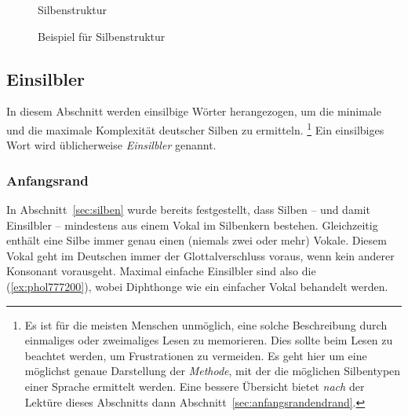 \begin{figure}
  \centering
  \caption{Silbenstruktur}
  \label{fig:silbenstruktur}
\end{figure}

\begin{figure}
  \centering
  \caption{Beispiel für Silbenstruktur}
  \label{fig:phonstr}
\end{figure}








\subsection{Einsilbler}

\label{sec:einsilbler}

In diesem Abschnitt werden einsilbige Wörter herangezogen, um die minimale und die maximale Komplexität deutscher Silben zu ermitteln.%
\footnote{Es ist für die meisten Menschen unmöglich, eine solche Beschreibung durch einmaliges oder zweimaliges Lesen zu memorieren.
Dies sollte beim Lesen zu beachtet werden, um Frustrationen zu vermeiden.
Es geht hier um eine möglichst genaue Darstellung der \textit{Methode}, mit der die möglichen Silbentypen einer Sprache ermittelt werden.
Eine bessere Übersicht bietet \textit{nach} der Lektüre dieses Abschnitts dann Abschnitt~\ref{sec:anfangsrandendrand}.}
Ein einsilbiges Wort wird üblicherweise \textit{Einsilbler} genannt.

\subsubsection{Anfangsrand}

In Abschnitt~\ref{sec:silben} wurde bereits festgestellt, dass Silben -- und damit Einsilbler -- mindestens aus einem Vokal im Silbenkern bestehen.
Gleichzeitig enthält eine Silbe immer genau einen (niemals zwei oder mehr) Vokale.
Diesem Vokal geht im Deutschen immer der Glottalverschluss voraus, wenn kein anderer Konsonant vorausgeht.
Maximal einfache Einsilbler sind also die (\ref{ex:phol777200}), wobei Diphthonge wie ein einfacher Vokal behandelt werden.

